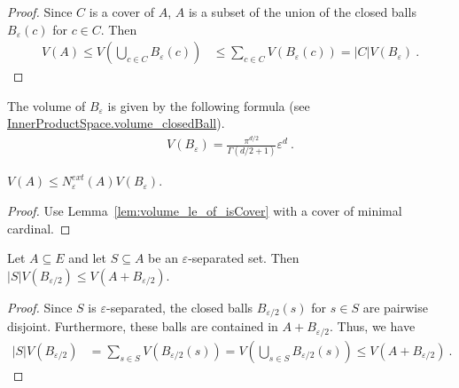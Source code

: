 \begin{proof}
Since $C$ is a cover of $A$, $A$ is a subset of the union of the closed balls $B_\varepsilon(c)$ for $c \in C$. Then
\begin{align*}
  V(A) \le V(\bigcup_{c \in C} B_\varepsilon(c))
  &\le \sum_{c \in C} V(B_\varepsilon(c))
  = \vert C \vert V(B_\varepsilon)
  \: .
\end{align*}
\end{proof}

The volume of $B_\varepsilon$ is given by the following formula (see \href{https://leanprover-community.github.io/mathlib4_docs/Mathlib/MeasureTheory/Measure/Lebesgue/VolumeOfBalls.html#InnerProductSpace.volume_closedBall}{InnerProductSpace.volume\_closedBall}).
\begin{align*}
  V(B_\varepsilon) = \frac{\pi^{d/2}}{\Gamma(d/2 + 1)} \varepsilon^d
  \: .
\end{align*}


\begin{lemma}\label{lem:volume_le_externalCoveringNumber_mul}
  \leanok
$V(A) \le N^{ext}_\varepsilon(A) V(B_\varepsilon)$.
\end{lemma}

\begin{proof}
Use Lemma~\ref{lem:volume_le_of_isCover} with a cover of minimal cardinal.
\end{proof}


\begin{lemma}\label{lem:le_volume_of_isSeparated}
  \leanok
Let $A \subseteq E$ and let $S \subseteq A$ be an $\varepsilon$-separated set.
Then $\vert S \vert V(B_{\varepsilon/2}) \le V(A + B_{\varepsilon/2})$.
\end{lemma}

\begin{proof}
Since $S$ is $\varepsilon$-separated, the closed balls $B_{\varepsilon/2}(s)$ for $s \in S$ are pairwise disjoint.
Furthermore, these balls are contained in $A + B_{\varepsilon/2}$.
Thus, we have
\begin{align*}
  \vert S \vert V(B_{\varepsilon/2})
  &= \sum_{s \in S} V(B_{\varepsilon/2}(s))
  = V(\bigcup_{s \in S} B_{\varepsilon/2}(s))
  \le V(A + B_{\varepsilon/2})
  \: .
\end{align*}
\end{proof}


